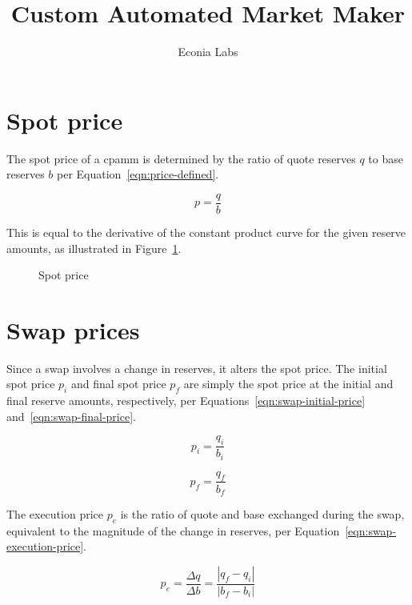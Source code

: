 \documentclass[table, twocolumn]{article}
\title{Custom Automated Market Maker}
\author{Econia Labs}
\date{}
\begin{document}

\maketitle

\section{Spot price}\label{sec:spot-price}

The spot price of a \gls*{cpamm} is determined by the ratio of quote reserves $q$ to
base reserves $b$ per Equation~\ref{eqn:price-defined}.

\begin{equation}\label{eqn:price-defined}
	p = \frac{q}{b}
\end{equation}

This is equal to the derivative of the constant product curve for the given reserve
amounts, as illustrated in Figure~\ref{fig:spot-price}.

\begin{figure}[!htb]
	\centering
	
	\caption{Spot price}\label{fig:spot-price}
\end{figure}

\section{Swap prices}\label{sec:swap-prices}

Since a swap involves a change in reserves, it alters the spot price. The initial spot
price $p_i$ and final spot price $p_f$ are simply the spot price at the initial and
final reserve amounts, respectively, per Equations~\ref{eqn:swap-initial-price}
and~\ref{eqn:swap-final-price}.

\begin{equation}\label{eqn:swap-initial-price}
	p_i = \frac{q_i}{b_i}
\end{equation}

\begin{equation}\label{eqn:swap-final-price}
	p_f = \frac{q_f}{b_f}
\end{equation}

The execution price $p_e$ is the ratio of quote and base exchanged during the swap,
equivalent to the magnitude of the change in reserves, per
Equation~\ref{eqn:swap-execution-price}.

\begin{equation}\label{eqn:swap-execution-price}
	p_e = \frac{\Delta q}{\Delta b} = \frac{|q_f - q_i|}{|b_f - b_i|}
\end{equation}
\end{document}
